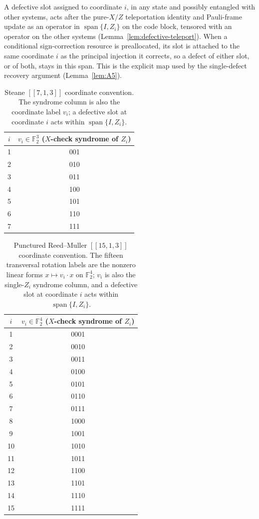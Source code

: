 \documentclass[aps,prx,reprint,superscriptaddress,nofootinbib,floatfix,longbibliography]{revtex4-2}
\theoremstyle{definition}
\begin{document}
A defective slot assigned to coordinate $i$, in any state and possibly entangled with other systems, acts after the pure-$X/Z$ teleportation identity and Pauli-frame update as an operator in $\operatorname{span}\{I,Z_i\}$ on the code block, tensored with an operator on the other systems (Lemma~\ref{lem:defective-teleport}).  When a conditional sign-correction resource is preallocated, its slot is attached to the same coordinate $i$ as the principal injection it corrects, so a defect of either slot, or of both, stays in this span.  This is the explicit map used by the single-defect recovery argument (Lemma~\ref{lem:A5}).

\begin{table}[t]
\caption{Steane $[[7,1,3]]$ coordinate convention.  The syndrome column is also the coordinate label $v_i$; a defective slot at coordinate $i$ acts within $\operatorname{span}\{I,Z_i\}$.}
\label{tab:steane-map}
\centering
\begin{tabular}{c c}
\hline\hline
$i$ & $v_i\in\mathbb F_2^3$ ($X$-check syndrome of $Z_i$) \\
\hline
1 & 001\\
2 & 010\\
3 & 011\\
4 & 100\\
5 & 101\\
6 & 110\\
7 & 111\\
\hline\hline
\end{tabular}
\end{table}

\begin{table}[t]
\caption{Punctured Reed--Muller $[[15,1,3]]$ coordinate convention.  The fifteen transversal rotation labels are the nonzero linear forms $x\mapsto v_i\!\cdot x$ on $\mathbb F_2^4$; $v_i$ is also the single-$Z_i$ syndrome column, and a defective slot at coordinate $i$ acts within $\operatorname{span}\{I,Z_i\}$.}
\label{tab:rm-map}
\centering
\begin{tabular}{c c}
\hline\hline
$i$ & $v_i\in\mathbb F_2^4$ ($X$-check syndrome of $Z_i$)\\
\hline
1 & 0001\\
2 & 0010\\
3 & 0011\\
4 & 0100\\
5 & 0101\\
6 & 0110\\
7 & 0111\\
8 & 1000\\
9 & 1001\\
10 & 1010\\
11 & 1011\\
12 & 1100\\
13 & 1101\\
14 & 1110\\
15 & 1111\\
\hline\hline
\end{tabular}
\end{table}
\end{document}
